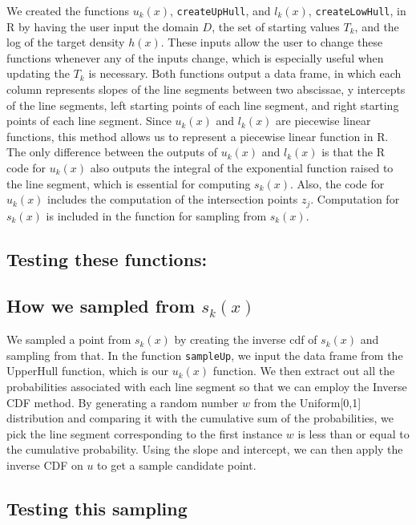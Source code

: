 \documentclass[12pt]{article}\usepackage[]{graphicx}\usepackage[]{color}
\begin{document}
We created the functions $u_k(x)$, \texttt{createUpHull}, and $l_k(x)$, \texttt{createLowHull}, in \textsf{R} by having the user input the domain $D$, the set of starting values $T_k$, and the log of the target density $h(x)$.  These inputs allow the user to change these functions whenever any of the inputs change, which is especially useful when updating the $T_k$ is necessary.  Both functions output a data frame, in which each column represents slopes of the line segments between two abscissae, y intercepts of the line segments, left starting points of each line segment, and right starting points of each line segment.  Since $u_k(x)$ and $l_k(x)$ are piecewise linear functions, this method allows us to represent a piecewise linear function in \textsf{R}.  The only difference between the outputs of $u_k(x)$ and $l_k(x)$ is that the \textsf{R} code for $u_k(x)$ also outputs the integral of the exponential function raised to the line segment, which is essential for computing $s_k(x)$.  Also, the code for $u_k(x)$ includes the computation of the intersection points $z_j$.  Computation for $s_k(x)$ is included in the function for sampling from $s_k(x)$.

\subsection*{Testing these functions:}

\subsection*{How we sampled from $s_k(x)$}

We sampled a point from $s_k(x)$ by creating the inverse cdf of $s_k(x)$ and sampling from that.  In the function \texttt{sampleUp}, we input the data frame from the UpperHull function, which is our $u_k(x)$ function. We then extract out all the probabilities associated with each line segment so that we can employ the Inverse CDF method.  By generating a random number $w$ from the Uniform[0,1] distribution and comparing it with the cumulative sum of the probabilities, we pick the line segment corresponding to the first instance $w$ is less than or equal to the cumulative probability.  Using the slope and intercept, we can then apply the inverse CDF on $u$ to get a sample candidate point.\\

\subsection*{Testing this sampling}
\end{document}
